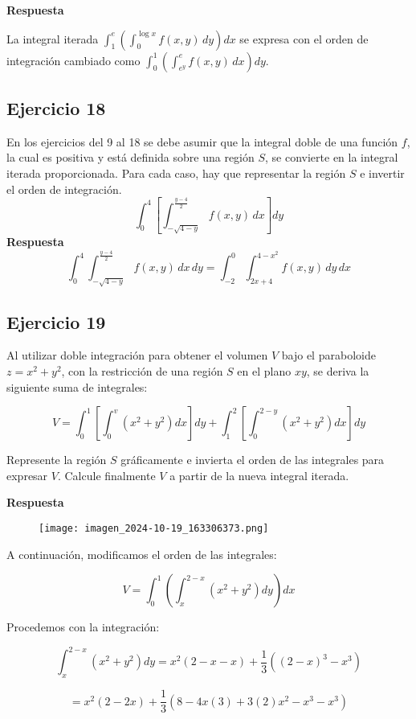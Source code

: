 \documentclass{report}
\begin{document}
\textbf{Respuesta}

La integral iterada $\int_1^{e} \left( \int_0^{\log x} f(x,y) \, dy \right) dx$ se expresa con el orden de integración cambiado como $\int_0^{1} \left( \int_{e^y}^{e} f(x,y) \, dx \right) dy$.\subsection{Ejercicio 18}  
En los ejercicios del 9 al 18 se debe asumir que la integral doble de una función $f$, la cual es positiva y está definida sobre una región $S$, se convierte en la integral iterada proporcionada. Para cada caso, hay que representar la región $S$ e invertir el orden de integración.\\
\[ 
\int_{0}^{4}\left[\int_{-\sqrt{4-y}}^{\frac{y-4}{2}} f(x, y) \, d x\right] d y
\]
\textbf{Respuesta}  
\[
\int_0^4 \int_{-\sqrt{4-y}}^{\frac{y-4}{2}} f(x,y) \, dx \, dy = \int_{-2}^0 \int_{2x+4}^{4-x^2} f(x,y) \, dy \, dx
\]\subsection{Ejercicio 19}
Al utilizar doble integración para obtener el volumen \( V \) bajo el paraboloide \( z = x^{2} + y^{2} \), con la restricción de una región \( S \) en el plano \( xy \), se deriva la siguiente suma de integrales:

\[
V = \int_{0}^{1}\left[\int_{0}^{v}\left(x^{2}+y^{2}\right) dx\right] dy + \int_{1}^{2}\left[\int_{0}^{2-y}\left(x^{2}+y^{2}\right) dx\right] dy
\]

Represente la región \( S \) gráficamente e invierta el orden de las integrales para expresar \( V \). Calcule finalmente \( V \) a partir de la nueva integral iterada.

\textbf{Respuesta}
\begin{figure}[h]
\texttt{[image: imagen\_2024-10-19\_163306373.png]}
\centering
\end{figure}

A continuación, modificamos el orden de las integrales:

\[
V = \int_{0}^{1} \left( \int_{x}^{2-x} (x^2 + y^2) dy \right) dx
\]

Procedemos con la integración:

\[
\int_{x}^{2-x} \left( x^2 + y^2 \right) dy = x^2 (2 - x - x) + \frac{1}{3} \left( (2-x)^3 - x^3 \right)
\]

\[
= x^2 (2 - 2x) + \frac{1}{3} \left( 8 - 4x(3) + 3(2)x^2 - x^3 - x^3 \right)
\]
\end{document}
